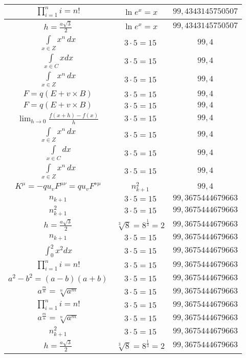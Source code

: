 \documentclass{article}
\begin{document}
\begin{flushleft}
\begin{longtable}{|c|c|c|}
$\prod_{i=1}^ni=n!$ & $\ln e^x=x$ & $99,4343145750507$ \\ \hline 
$h=\frac{a\sqrt{3}}{2}$ & $\ln e^x=x$ & $99,4343145750507$ \\ \hline 
$\int \limits_{x\in Z}\!x^{n}\,dx$ & $3\cdot 5=15$ & $99,4$ \\ \hline 
$\int \limits_{x\in C}xdx$ & $3\cdot 5=15$ & $99,4$ \\ \hline 
$\int \limits_{x\in Z}\!x^{n}\,dx$ & $3\cdot 5=15$ & $99,4$ \\ \hline 
$F=q\left(E+v\times B\right)$ & $3\cdot 5=15$ & $99,4$ \\ \hline 
$F=q\left(E+v\times B\right)$ & $3\cdot 5=15$ & $99,4$ \\ \hline 
$\lim_{h\to0}\frac{f(x+h)-f(x)}{h}$ & $3\cdot 5=15$ & $99,4$ \\ \hline 
$\int \limits_{x\in Z}\!x^{n}\,dx$ & $3\cdot 5=15$ & $99,4$ \\ \hline 
$\int \limits_{x\in C}dx$ & $3\cdot 5=15$ & $99,4$ \\ \hline 
$\int \limits_{x\in Z}\!x^{n}\,dx$ & $3\cdot 5=15$ & $99,4$ \\ \hline 
$K^\mu=-qu_vF^{\mu\nu}=qu_vF^{\nu\mu}$ & $n_{k+1}^2$ & $99,4$ \\ \hline 
$n_{k+1}$ & $3\cdot 5=15$ & $99,3675444679663$ \\ \hline 
$n_{k+1}^2$ & $3\cdot 5=15$ & $99,3675444679663$ \\ \hline 
$h=\frac{a\sqrt{3}}{2}$ & $\sqrt[3]{8}=8^{\frac{1}{3}}=2$ & $99,3675444679663$ \\ \hline 
$n_{k+1}$ & $3\cdot 5=15$ & $99,3675444679663$ \\ \hline 
$\int _0^2x^2dx$ & $3\cdot 5=15$ & $99,3675444679663$ \\ \hline 
$\prod_{i=1}^ni=n!$ & $3\cdot 5=15$ & $99,3675444679663$ \\ \hline 
$a^2-b^2=(a-b)(a+b)$ & $3\cdot 5=15$ & $99,3675444679663$ \\ \hline 
$a^{\frac{m}{n}}=\sqrt[n]{a^{m}}$ & $3\cdot 5=15$ & $99,3675444679663$ \\ \hline 
$\prod_{i=1}^ni=n!$ & $3\cdot 5=15$ & $99,3675444679663$ \\ \hline 
$a^{\frac{m}{n}}=\sqrt[n]{a^{m}}$ & $3\cdot 5=15$ & $99,3675444679663$ \\ \hline 
$n_{k+1}^2$ & $3\cdot 5=15$ & $99,3675444679663$ \\ \hline 
$h=\frac{a\sqrt{3}}{2}$ & $\sqrt[3]{8}=8^{\frac{1}{3}}=2$ & $99,3675444679663$ \\ \hline 

\end{longtable}
\end{flushleft}
\end{document}
